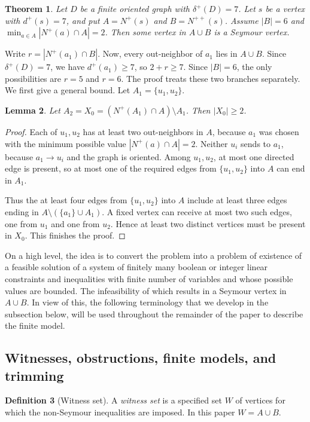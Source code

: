 \documentclass[a4paper,fleqn]{cas-sc}
\newtheorem{theorem}{Theorem}[section]
\newtheorem{lemma}[theorem]{Lemma}
\theoremstyle{definition}
\newtheorem{definition}[theorem]{Definition}
\begin{document}
\begin{theorem}\label{thm:main}
Let $D$ be a finite oriented graph with $\delta^+(D)=7$.  Let $s$ be a vertex with $d^+(s)=7$, and put $A=N^+(s)$ and $B=N^{++}(s)$.
Assume $|B|=6$ and $\min_{a\in A}|N^+(a)\cap A|=2$.
Then some vertex in $A\cup B$ is a Seymour vertex.
\end{theorem}


Write $r=|N^+(a_1)\cap B|.$
Now, every out-neighbor of $a_1$ lies in $A\cup B$. Since $\delta^+(D)=7$, we have $d^+(a_1)\ge 7$, so $2+r\ge 7$. Since $|B|=6$, the only possibilities are $r=5$ and $r=6.$
The proof treats these two branches separately. We first give a general bound. Let $A_1=\{u_1,u_2\}$.

\begin{lemma}\label{lem:X-at-least-2}
Let $A_2=X_0=(N^+(A_1)\cap A)\setminus A_1$. Then $|X_0|\ge 2$.
\end{lemma}
\begin{proof}
Each of $u_1,u_2$ has at least two out-neighbors in $A$, because $a_1$ was chosen with the minimum possible value $|N^+(a)\cap A|=2$.  Neither $u_i$ sends to $a_1$, because $a_1\to u_i$ and the graph is oriented.  Among $u_1,u_2$, at most one directed edge is present, so at most one of the required edges from $\{u_1,u_2\}$ into $A$ can end in $A_1$.

Thus the at least four edges from $\{u_1,u_2\}$ into $A$ include at least three edges ending in $A\setminus(\{a_1\}\cup A_1)$.  A fixed vertex can receive at most two such edges, one from $u_1$ and one from $u_2$.  Hence at least two distinct vertices must be present in $X_0$. This finishes the proof.
\end{proof}


On a high level, the idea is to convert the problem into a problem of existence of a feasible solution of a system of finitely many boolean or integer linear constraints and inequalities with finite number of variables and whose possible values are bounded. The infeasibility of which results in a Seymour vertex in \(A\cup B\). In view of this, the following terminology that we develop in the subsection below, will be used throughout the remainder of the paper to describe the finite model. 




\subsection{Witnesses, obstructions, finite models, and trimming}
\begin{definition}[Witness set]
A \emph{witness set} is a specified set $W$ of vertices for which the non-Seymour inequalities are imposed. In this paper $W=A\cup B$.
\end{definition}
\end{document}
